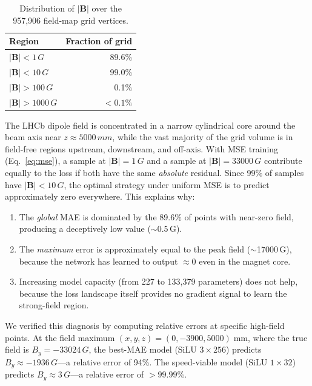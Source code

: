 \documentclass[11pt,a4paper]{article}
\newcommand{\SI}[2]{#1\,#2}
\begin{document}
\begin{table}[h]
    \centering
    \caption{Distribution of $|\mathbf{B}|$ over the 957{,}906 field-map
    grid vertices.}
    \label{tab:field_dist}
    \begin{tabular}{lr}
        \toprule
        Region & Fraction of grid \\
        \midrule
        $|\mathbf{B}| < \SI{1}{G}$    & 89.6\% \\
        $|\mathbf{B}| < \SI{10}{G}$   & 99.0\% \\
        $|\mathbf{B}| > \SI{100}{G}$  &  0.1\% \\
        $|\mathbf{B}| > \SI{1000}{G}$ & $<0.1\%$ \\
        \bottomrule
    \end{tabular}
\end{table}

The LHCb dipole field is concentrated in a narrow cylindrical core
around the beam axis near $z \approx \SI{5000}{mm}$, while the vast
majority of the grid volume is in field-free regions upstream,
downstream, and off-axis.  With MSE training
(Eq.~\ref{eq:mse}), a sample at $|\mathbf{B}| = \SI{1}{G}$ and a sample
at $|\mathbf{B}| = \SI{33000}{G}$ contribute equally to the loss if
both have the same \emph{absolute} residual.  Since 99\% of samples
have $|\mathbf{B}| < \SI{10}{G}$, the optimal strategy under uniform
MSE is to predict approximately zero everywhere.  This explains why:

\begin{enumerate}
    \item The \emph{global} MAE is dominated by the 89.6\% of points
          with near-zero field, producing a deceptively low value
          ($\sim$\SI{0.5}{G}).
    \item The \emph{maximum} error is approximately equal to the peak
          field ($\sim$\SI{17000}{G}), because the network has learned
          to output $\approx 0$ even in the magnet core.
    \item Increasing model capacity (from 227 to 133{,}379 parameters)
          does not help, because the loss landscape itself provides no
          gradient signal to learn the strong-field region.
\end{enumerate}

We verified this diagnosis by computing relative errors at specific
high-field points.  At the field maximum
$(x, y, z) = (0, -3900, 5000)\;\text{mm}$, where the true field is
$B_y = -\SI{33024}{G}$, the best-MAE model (SiLU $3{\times}256$)
predicts $B_y \approx -\SI{1936}{G}$---a relative error of 94\%.  The
speed-viable model (SiLU $1{\times}32$) predicts
$B_y \approx \SI{3}{G}$---a relative error of $>99.99\%$.
\end{document}
